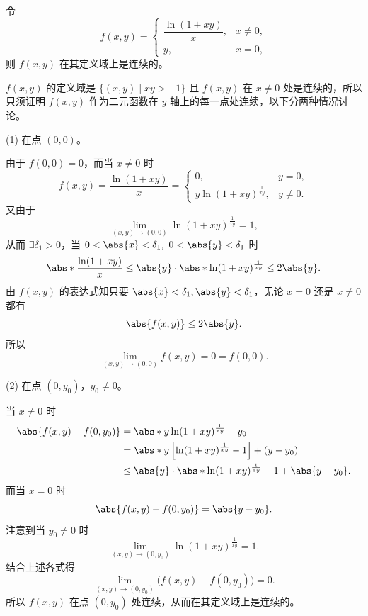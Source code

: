 \begin{xexample}[18.2.1]
令
\[
  f(x,y)=
  \begin{cases}
    \dfrac{\ln(1+xy)}{x}, & x\ne0,\\[5pt]
    y, & x=0,
  \end{cases}
\]
则 $f(x,y)$ 在其定义域上是连续的。
\end{xexample}
\begin{xproof}
$f(x,y)$ 的定义域是 $\{(x,y)\mid xy>-1\}$ 且 $f(x,y)$ 在 $x\ne0$ 处是连续的，所以只须证明 $f(x,y)$ 作为二元函数在 $y$ 轴上的每一点处连续，以下分两种情况讨论。

(1) 在点 $(0,0)$。

由于 $f(0,0)=0$，而当 $x\ne0$ 时
\[
  f(x,y)=\frac{\ln(1+xy)}{x}
  =
  \begin{cases}
    0, & y=0,\\[3pt]
    y\ln(1+xy)^{\frac1{xy}}, & y\ne0.
  \end{cases}
\]
又由于
\[
  \lim_{(x,y)\to(0,0)}\ln(1+xy)^{\frac1{xy}}=1,
\]
从而 $\exists\delta_1>0$，当 $0<\abs{x}<\delta_1,\ 0<\abs{y}<\delta_1$ 时
\[
  \abs*{\frac{\ln(1+xy)}{x}}
  \le\abs{y}\cdot\abs*{\ln(1+xy)^{\frac1{xy}}}
  \le2\abs{y}.
\]
由 $f(x,y)$ 的表达式知只要 $\abs{x}<\delta_1,\abs{y}<\delta_1$，无论 $x=0$ 还是 $x\ne0$ 都有
\[
  \abs{f(x,y)}\le2\abs{y}.
\]
所以
\[
  \lim_{(x,y)\to(0,0)}f(x,y)=0=f(0,0).
\]

(2) 在点 $(0,y_0)$，$y_0\ne0$。

当 $x\ne0$ 时
\begin{align*}
  \abs{f(x,y)-f(0,y_0)}
  &=\abs*{y\ln(1+xy)^{\frac1{xy}}-y_0}\\
  &=\abs*{y\left[\ln(1+xy)^{\frac1{xy}}-1\right]+(y-y_0)}\\
  &\le \abs{y}\cdot\abs*{\ln(1+xy)^{\frac1{xy}}-1}+\abs{y-y_0}.
\end{align*}
而当 $x=0$ 时
\[
  \abs{f(x,y)-f(0,y_0)}=\abs{y-y_0}.
\]
注意到当 $y_0\ne0$ 时
\[
  \lim_{(x,y)\to(0,y_0)}\ln(1+xy)^{\frac1{xy}}=1.
\]
结合上述各式得
\[
  \lim_{(x,y)\to(0,y_0)}\bigl(f(x,y)-f(0,y_0)\bigr)=0.
\]
所以 $f(x,y)$ 在点 $(0,y_0)$ 处连续，从而在其定义域上是连续的。
\end{xproof}


